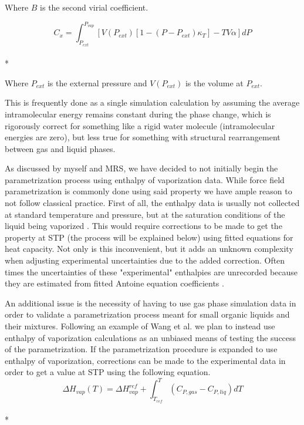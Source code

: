 \documentclass[aps,pre,twocolumn,nofootinbib,superscriptaddress,linenumbers,10pt, draft,tightenlines]{revtex4-1}
\begin{document}
Where $B$ is the second virial coefficient.

\begin{equation}C_x = \int_{P_{ext}}^{P_{vap}} \left[V\left(P_{ext}\right)\left[1 - \left(P - P_{ext}\right) \kappa_T\right] - T V \alpha\right] dP\end{equation}\\*

Where $P_{ext}$ is the external pressure and $V\left(P_{ext}\right)$ is the volume at $P_{ext}$. 

This is frequently done as a single simulation calculation by assuming
the average intramolecular energy remains constant during the phase
change, which is rigorously correct for something like a rigid water
molecule (intramolecular energies are zero), but less true for
something with structural rearrangement between gas and liquid phases. 

As discussed by myself and MRS, we have decided to not initially begin the parametrization process using enthalpy of vaporization data. While force field parametrization is commonly done using said property we have ample reason to not follow classical practice. First of all, the enthalpy data is usually not collected at standard temperature and pressure, but at the saturation conditions of the liquid being vaporized \cite{chickos}.  This would require corrections to be made to get the property at STP (the process will be explained below) using fitted equations for heat capacity. Not only is this inconvenient, but it adds an unknown complexity when adjusting experimental uncertainties due to the added correction. Often times the uncertainties of these "experimental" enthalpies are unrecorded because they are estimated from fitted Antoine equation coefficients \cite{chickos}. 

An additional issue is the necessity of having to use gas phase simulation data in order to validate a parametrization process meant for small organic liquids and their mixtures. Following an example of Wang et al. \cite{FF99vdw} we plan to instead use enthalpy of vaporization calculations as an unbiased means of testing the success of the parametrization. If the parametrization procedure is expanded to use enthalpy of vaporization, corrections can be made to the experimental data in order to get a value at STP using the following equation.
\begin{equation}\Delta H_{vap}(T) = \Delta H_{vap}^{ref} + \int_{T_{ref}}^T \left(C_{P, gas} - C_{P, liq}\right) dT \end{equation}\\*
\end{document}
